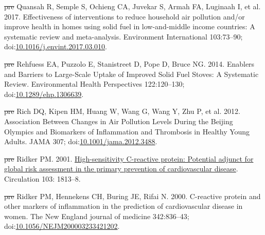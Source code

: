 \documentclass[
  letterpaper,
  DIV=11,
  numbers=noendperiod]{scrartcl}
\newlength{\cslhangindent}
\newenvironment{CSLReferences}[2] %
 {\begin{list}{}{%
  \setlength{\itemindent}{0pt} %
  \setlength{\leftmargin}{0pt} %
  \setlength{\parsep}{0pt} %
  \ifodd #1
   \setlength{\leftmargin}{\cslhangindent} %
   \setlength{\itemindent}{-1\cslhangindent} %
  \fi
  \setlength{\itemsep}{#2\baselineskip}}} %
 {\end{list}} %
\providecommand{\DIFdel}[1]{{\protect\color{red}\sout{#1}}}                      %
\providecommand{\DIFaddbegin}{} %
\providecommand{\DIFaddend}{} %
\providecommand{\DIFdelbegin}{} %
\providecommand{\DIFdelend}{} %
\newcommand{\DIFscaledelfig}{0.5}
\newlength{\DIFdelgraphicswidth} %
\newlength{\DIFdelgraphicsheight} %
\newcommand{\DIFaddincludegraphics}[2][]{{\color{blue}\fbox{\DIFOincludegraphics[#1]{#2}}}} %
\newcommand{\DIFdelincludegraphics}[2][]{%
\sbox{\DIFdelgraphicsbox}{\DIFOincludegraphics[#1]{#2}}%
\settoboxwidth{\DIFdelgraphicswidth}{\DIFdelgraphicsbox} %
\settoboxtotalheight{\DIFdelgraphicsheight}{\DIFdelgraphicsbox} %
\scalebox{\DIFscaledelfig}{%
\parbox[b]{\DIFdelgraphicswidth}{\usebox{\DIFdelgraphicsbox}\\[-\baselineskip] \rule{\DIFdelgraphicswidth}{0em}}\llap{\resizebox{\DIFdelgraphicswidth}{\DIFdelgraphicsheight}{%
\setlength{\unitlength}{\DIFdelgraphicswidth}%
\begin{picture}(1,1)%
\thicklines\linethickness{2pt} %
{\color[rgb]{1,0,0}\put(0,0){\framebox(1,1){}}}%
{\color[rgb]{1,0,0}\put(0,0){\line( 1,1){1}}}%
{\color[rgb]{1,0,0}\put(0,1){\line(1,-1){1}}}%
\end{picture}%
}\hspace*{3pt}}} %
} %
\DeclareRobustCommand{\DIFaddbegin}{\DIFOaddbegin \let\includegraphics\DIFaddincludegraphics} %
\DeclareRobustCommand{\DIFaddend}{\DIFOaddend \let\includegraphics\DIFOincludegraphics} %
\DeclareRobustCommand{\DIFdelbegin}{\DIFOdelbegin \let\includegraphics\DIFdelincludegraphics} %
\DeclareRobustCommand{\DIFdelend}{\DIFOaddend \let\includegraphics\DIFOincludegraphics} %
\begin{document}
\begin{CSLReferences}{1}{1}
\DIFdelbegin %
\DIFdel{pre}%
\DIFdelend \DIFaddbegin {}
\DIFaddend Quansah R, Semple S, Ochieng CA, Juvekar S, Armah FA, Luginaah I, et al.
2017. Effectiveness of interventions to reduce household air pollution
and/or improve health in homes using solid fuel in low-and-middle income
countries: {A} systematic review and meta-analysis. Environment
International 103:73--90;
doi:\href{https://doi.org/10.1016/j.envint.2017.03.010}{10.1016/j.envint.2017.03.010}.

\DIFdelbegin %
\DIFdel{pre}%
\DIFdelend \DIFaddbegin {}
\DIFaddend Rehfuess EA, Puzzolo E, Stanistreet D, Pope D, Bruce NG. 2014. Enablers
and {Barriers} to {Large-Scale Uptake} of {Improved Solid Fuel Stoves}:
{A Systematic Review}. Environmental Health Perspectives 122:120--130;
doi:\href{https://doi.org/10.1289/ehp.1306639}{10.1289/ehp.1306639}.

\DIFdelbegin %
\DIFdel{pre}%
\DIFdelend \DIFaddbegin {}
\DIFaddend Rich DQ, Kipen HM, Huang W, Wang G, Wang Y, Zhu P, et al. 2012.
Association {Between Changes} in {Air Pollution Levels During} the
{Beijing Olympics} and {Biomarkers} of {Inflammation} and {Thrombosis}
in {Healthy Young Adults}. JAMA 307;
doi:\href{https://doi.org/10.1001/jama.2012.3488}{10.1001/jama.2012.3488}.

\DIFdelbegin %
\DIFdel{pre}%
\DIFdelend \DIFaddbegin {}
\DIFaddend Ridker PM. 2001.
\href{https://www.ncbi.nlm.nih.gov/pubmed/11282915}{High-sensitivity
{C-reactive} protein: Potential adjunct for global risk assessment in
the primary prevention of cardiovascular disease}. Circulation 103:
1813--8.

\DIFdelbegin %
\DIFdel{pre}%
\DIFdelend \DIFaddbegin {}
\DIFaddend Ridker PM, Hennekens CH, Buring JE, Rifai N. 2000. C-reactive protein
and other markers of inflammation in the prediction of cardiovascular
disease in women. The New England journal of medicine 342:836--43;
doi:\href{https://doi.org/10.1056/NEJM200003233421202}{10.1056/NEJM200003233421202}.


\end{CSLReferences}
\end{document}
